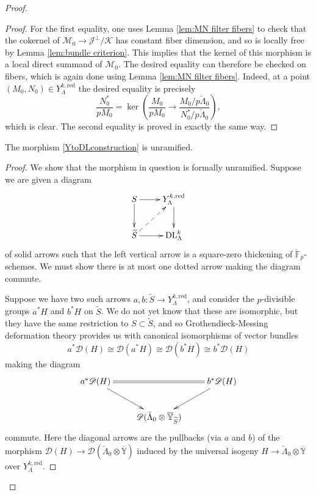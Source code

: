 \documentclass[11pt]{alggeom}
\newcommand{\iso}{\cong}
\newcommand{\red}{\mathrm{red}}
\newcommand{\F}{\mathbb F}
\begin{document}
\begin{proof}
\begin{proof}
For the first equality, one uses Lemma \ref{lem:MN filter fibers} to check that the cokernel of 
$ \mathscr{M}_0 \to \mathscr{J}^\perp / \mathscr{K}$ has constant fiber dimension, and so is locally free by Lemma \ref{lem:bundle criterion}.  This implies that the kernel of this morphism is a local direct summand of $\mathscr{M}_0$.  The desired equality can therefore be checked on fibers, which is again done using Lemma \ref{lem:MN filter fibers}.  Indeed, at a point $(M_0,N_0) \in  Y^{k,\red}_\Lambda$  the desired equality is precisely
\[
\frac{N^*_0}{pM_0}  = \ker\left(   \frac{M_0}{pM_0}  \to  \frac{ M_0 / p \breve{\Lambda}_0 }{ N_0^*  / p \breve{\Lambda}_0 }  \right) ,
\]
which is clear.
The second equality is proved in exactly the same way. 
\end{proof}


\begin{lemma}\label{lem:YtoDLunr}
The morphism \eqref{YtoDLconstruction} is  unramified.
\end{lemma}

\begin{proof}
We show that the morphism in question is formally unramified.
Suppose we are given a diagram 
\[
\xymatrix{
{ S }  \ar[d] \ar[r]  & { Y^{k,\red}_\Lambda   }  \ar[d] \\
{ \widetilde{S} } \ar[r]  \ar@{-->}[ur] & {  \mathrm{DL}_\Lambda^k }  
}
\]
of solid arrows such that the left vertical arrow is a square-zero thickening of $\breve{\F}_p$-schemes.
We must show there is at most one dotted arrow making the diagram commute.

Suppose we have two such arrows $a,b : \widetilde{S} \to Y^{k,\red}_\Lambda$, and consider the $p$-divisible groups $a^*H$ and $b^*H$ on $\widetilde{S}$.  
We do not yet know that these are isomorphic, but they have the same restriction to $S \subset \widetilde{S}$, and so  Grothendieck-Messing deformation theory provides us with  canonical isomorphisms of vector bundles 
\[
a^*\mathscr{D}(H)\iso 
\mathscr{D}(a^*H) \iso \mathscr{D}(b^*H)  \iso b^*\mathscr{D}(H)
\]
 making the diagram 
\[
\xymatrix{
{ a^*  \mathscr{D}( H) }  \ar[dr]   \ar@{=}[rr]& &{ b^*  \mathscr{D}(H)  }  \ar[dl]  \\
&  {  \mathscr{D}( \breve{\Lambda}_0 \otimes \overline{\mathbb{Y}}_{\widetilde{S}} )}
}
\]
commute.  
Here the diagonal arrows are the pullbacks (via $a$ and $b$) of the morphism $\mathscr{D}(H) \to \mathscr{D}( \breve{\Lambda}_0 \otimes \overline{\mathbb{Y}})$ induced by the universal isogeny $H \to  \breve{\Lambda}_0 \otimes \overline{\mathbb{Y}}$ over $Y^{k,\red}_\Lambda$.


\end{proof}
\end{proof}
\end{document}
